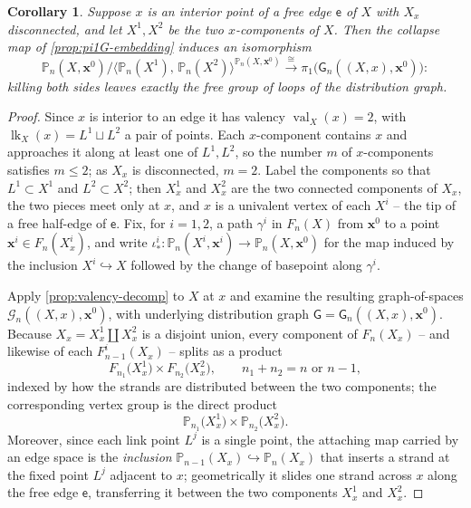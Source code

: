 \documentclass[reqno]{amsart}
\newtheorem{corollary}[theorem]{Corollary}
\theoremstyle{definition}
\newcommand\bfx{\mathbf{x}}
\newcommand\cG{\mathcal{G}}
\newcommand\sfG{\mathsf{G}}
\newcommand\sfe{\mathsf{e}}
\newcommand{\PB}{\mathbb{P}}
\newcommand{\co}[1]{\mathopen{\langle}#1\mathclose{\rangle}} %
\newcommand{\base}{\bfx^0}
\DeclareMathOperator{\lk}{lk}
\DeclareMathOperator{\val}{val}
\numberwithin{equation}{section}
\begin{document}
\begin{corollary}\label{cor:free-edge-both-quotient}
Suppose \(x\) is an interior point of a free edge \(\sfe\) of \(X\)
with \(X_x\) disconnected, and let \(X^1,X^2\) be the two
\(x\)-components of \(X\). Then the collapse map of
\cref{prop:pi1G-embedding} induces an isomorphism
\[
\PB_n(X,\base)\big/
\co{\PB_n(X^1),\,\PB_n(X^2)}^{\PB_n(X,\base)}
\xrightarrow{\cong}
\pi_1\bigl(\sfG_n((X,x),\base)\bigr):
\]
killing both sides leaves exactly the free group of loops of the
distribution graph.
\end{corollary}

\begin{proof}
Since \(x\) is interior to an edge it has valency
\(\val_X(x)=2\), with \(\lk_X(x)=L^1\sqcup L^2\) a pair of points.
Each \(x\)-component contains \(x\) and approaches it along at
least one of \(L^1,L^2\), so the number \(m\) of \(x\)-components
satisfies \(m\le2\); as \(X_x\) is disconnected, \(m=2\). Label
the components so that \(L^1\subset X^1\) and \(L^2\subset X^2\);
then \(X^1_x\) and \(X^2_x\) are the two connected components of
\(X_x\), the two pieces meet only at \(x\), and \(x\) is a
univalent vertex of each \(X^i\) -- the tip of a free half-edge of
\(\sfe\). Fix, for \(i=1,2\), a path \(\gamma^i\) in \(F_n(X)\) from
\(\base\) to a point \(\bfx^i\in F_n(X^i_x)\), and write
\(\iota^i_\ast\colon\PB_n(X^i,\bfx^i)\to\PB_n(X,\base)\) for the
map induced by the inclusion \(X^i\hookrightarrow X\) followed by
the change of basepoint along \(\gamma^i\).

Apply \cref{prop:valency-decomp} to \(X\) at \(x\) and examine the
resulting graph-of-spaces \(\cG_n((X,x),\base)\), with underlying distribution
graph \(\sfG=\sfG_n((X,x),\base)\). Because \(X_x=X^1_x\coprod
X^2_x\) is a disjoint union, every component of \(F_n(X_x)\) --
and likewise of each \(F_{n-1}^i(X_x)\) -- splits as a product
\[
F_{n_1}\bigl(X^1_x\bigr)\times F_{n_2}\bigl(X^2_x\bigr),
\qquad n_1+n_2=n\text{ or }n-1,
\]
indexed by how the strands are distributed between the two
components; the corresponding vertex group is the direct product
\[
\PB_{n_1}\bigl(X^1_x\bigr)\times\PB_{n_2}\bigl(X^2_x\bigr).
\]
Moreover, since each link point \(L^j\) is a single point, the
attaching map carried by an edge space is the \emph{inclusion}
\(\PB_{n-1}(X_x)\hookrightarrow\PB_n(X_x)\) that inserts a strand
at the fixed point \(L^j\) adjacent to \(x\); geometrically it
slides one strand across \(x\) along the free edge \(\sfe\),
transferring it between the two components \(X^1_x\) and
\(X^2_x\).


\end{proof}
\end{document}
